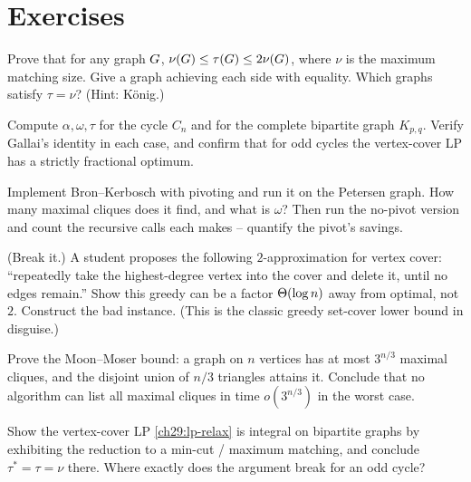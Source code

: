 \section*{Exercises}

\begin{exercise}
Prove that for any graph $G$, $\nu(G)\le\tau(G)\le 2\nu(G)$, where
$\nu$ is the maximum matching size. Give a graph achieving each side with
equality. Which graphs satisfy $\tau=\nu$? (Hint: K\"onig.)
\end{exercise}

\begin{exercise}
Compute $\alpha,\omega,\tau$ for the cycle $C_n$ and for the complete bipartite
graph $K_{p,q}$. Verify Gallai's identity in each case, and confirm that for odd
cycles the vertex-cover LP has a strictly fractional optimum.
\end{exercise}

\begin{exercise}
Implement Bron--Kerbosch with pivoting and run it on the Petersen graph. How many
maximal cliques does it find, and what is $\omega$? Then run the no-pivot version
and count the recursive calls each makes -- quantify the pivot's savings.
\end{exercise}

\begin{exercise}
(Break it.) A student proposes the following $2$-approximation for vertex cover:
``repeatedly take the highest-degree vertex into the cover and delete it, until no
edges remain.'' Show this greedy can be a factor $\Theta(\log n)$ away from optimal,
not $2$. Construct the bad instance. (This is the classic greedy set-cover lower
bound in disguise.)
\end{exercise}

\begin{exercise}
Prove the Moon--Moser bound: a graph on $n$ vertices has at most $3^{n/3}$
maximal cliques, and the disjoint union of $n/3$ triangles attains it. Conclude
that no algorithm can list all maximal cliques in time $o(3^{n/3})$ in the worst
case.
\end{exercise}

\begin{exercise}
Show the vertex-cover LP \eqref{ch29:lp-relax} is integral on bipartite graphs by
exhibiting the reduction to a min-cut / maximum matching, and conclude
$\tau^*=\tau=\nu$ there. Where exactly does the argument break for an odd cycle?
\end{exercise}

